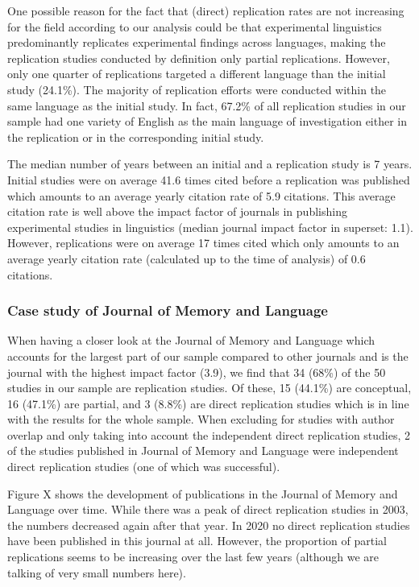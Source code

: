 \documentclass[]{elsarticle} %
\begin{document}
One possible reason for the fact that (direct) replication rates are not
increasing for the field according to our analysis could be that
experimental linguistics predominantly replicates experimental findings
across languages, making the replication studies conducted by definition
only partial replications. However, only one quarter of replications
targeted a different language than the initial study (24.1\%). The
majority of replication efforts were conducted within the same language
as the initial study. In fact, 67.2\% of all replication studies in our
sample had one variety of English as the main language of investigation
either in the replication or in the corresponding initial study.

The median number of years between an initial and a replication study is
7 years. Initial studies were on average 41.6 times cited before a
replication was published which amounts to an average yearly citation
rate of 5.9 citations. This average citation rate is well above the
impact factor of journals in publishing experimental studies in
linguistics (median journal impact factor in superset: 1.1). However,
replications were on average 17 times cited which only amounts to an
average yearly citation rate (calculated up to the time of analysis) of
0.6 citations.

\hypertarget{case-study-of-journal-of-memory-and-language}{%
\subsubsection{Case study of Journal of Memory and
Language}\label{case-study-of-journal-of-memory-and-language}}

When having a closer look at the Journal of Memory and Language which
accounts for the largest part of our sample compared to other journals
and is the journal with the highest impact factor (3.9), we find that 34
(68\%) of the 50 studies in our sample are replication studies. Of
these, 15 (44.1\%) are conceptual, 16 (47.1\%) are partial, and 3
(8.8\%) are direct replication studies which is in line with the results
for the whole sample. When excluding for studies with author overlap and
only taking into account the independent direct replication studies, 2
of the studies published in Journal of Memory and Language were
independent direct replication studies (one of which was successful).

Figure X shows the development of publications in the Journal of Memory
and Language over time. While there was a peak of direct replication
studies in 2003, the numbers decreased again after that year. In 2020 no
direct replication studies have been published in this journal at all.
However, the proportion of partial replications seems to be increasing
over the last few years (although we are talking of very small numbers
here).
\end{document}
